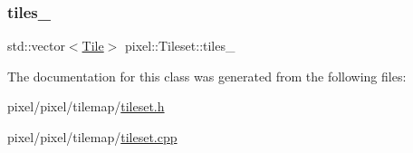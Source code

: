 \mbox{\label{classpixel_1_1_tileset_a3037828f512098ac7c6637ceb4819181}} 
\subsubsection{\texorpdfstring{tiles\+\_\+}{tiles\_}}
{\footnotesize\ttfamily std\+::vector$<$\hyperlink{structpixel_1_1_tileset_1_1_tile}{Tile}$>$ pixel\+::\+Tileset\+::tiles\+\_\+\hspace{0.3cm}{\ttfamily [private]}}



The documentation for this class was generated from the following files\+:\begin{DoxyCompactItemize}
\item 
pixel/pixel/tilemap/\hyperlink{tileset_8h}{tileset.\+h}\item 
pixel/pixel/tilemap/\hyperlink{tileset_8cpp}{tileset.\+cpp}\end{DoxyCompactItemize}
